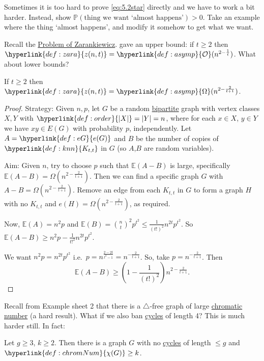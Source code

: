 \documentclass{article}
\begin{document}
Sometimes it is too hard to prove \eqref{eq:5.2star} directly and we have to work a bit harder.
Instead, show $\mathbb{P}(\text{thing we want `almost happens'}) > 0$.
Take an example where the thing `almost happens', and modify it somehow to get what we want.

Recall the \hyperlink{def:zara}{Problem of Zarankiewicz}.
 gave an upper bound: if $t \geq 2$ then $\hyperlink{def:zara}{z(n,t)} = \hyperlink{def:asymp}{\mathcal{O}}(n^{2 - \frac{1}{t}})$. What about lower bounds?
\begin{nthm}\label{thm:38}
    If $t \geq 2$ then $\hyperlink{def:zara}{z(n,t)} = \hyperlink{def:asymp}{\Omega}(n^{2 - \frac{2}{t+1}})$.
\end{nthm}
\begin{proof}
    Strategy: Given $n,p$, let $G$ be a random \hyperlink{def:bipartite}{bipartite} graph with vertex classes $X,Y$ with $\hyperlink{def:order}{|X|}=|Y|=n$, where for each $x \in X$, $y \in Y$ we have $xy \in E(G)$ with probability $p$, independently.
    Let $A = \hyperlink{def:eG}{e(G)}$ and $B$ be the number of copies of $\hyperlink{def:knn}{K_{t,t}}$ in $G$ (so $A$,$B$ are random variables).

    Aim: Given $n$, try to choose $p$ such that $\mathbb{E}(A-B)$ is large, specifically $\mathbb{E}(A-B) = \Omega(n^{2 - \frac{2}{t+1}})$.
    Then we can find a specific graph $G$ with $A-B = \Omega(n^{2-\frac{2}{t+1}})$.
    Remove an edge from each $K_{t,t}$ in $G$ to form a graph $H$ with no $K_{t,t}$ and $e(H) = \Omega(n^{2 - \frac{2}{t+1}})$, as required.

    Now, $\mathbb{E}(A) = n^2 p$ and $\mathbb{E}(B) = \binom{n}{t}^2 p^{t^2} \leq \frac{1}{(t!)^2} n^{2t}p^{t^2}$.
    So $\mathbb{E}(A-B) \geq n^2 p - \frac{1}{t!^2} n^{2t} p^{t^2}$.

    We want $n^2 p = n^{2t} p^{t^2}$ i.e.\ $p = n^{\frac{2-2t}{t^2-1}} = n^{-\frac{2}{t+1}}$.
    So, take $p = n^{-\frac{2}{t+1}}$.
    Then
    \begin{equation*}
        \mathbb{E}(A-B) \geq \left(1 - \frac{1}{(t!)^2}\right) n^{2 - \frac{2}{t+1}}.
    \end{equation*}
\end{proof}
Recall from Example sheet 2 that there is a \hyperlink{def:Kn}{$\triangle$}-free graph of large \hyperlink{def:chromNum}{chromatic number} (a hard result).
What if we also ban \hyperlink{def:cycle}{cycles} of length 4? This is much harder still. In fact:
\begin{nthm}\label{thm:39}
    Let $g \geq 3$, $k \geq 2$. Then there is a graph $G$ with no \hyperlink{def:cycle}{cycles} of length $\leq g$ and $\hyperlink{def:chromNum}{\chi(G)} \geq k$.
\end{nthm}
\end{document}
